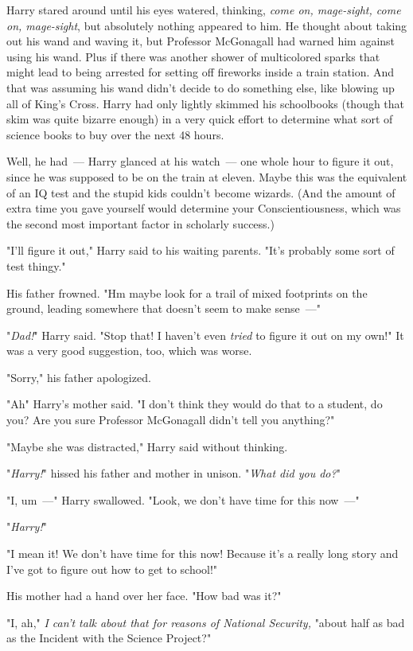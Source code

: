 Harry stared around until his eyes watered, thinking, \emph{come on,
mage-sight, come on, mage-sight}, but absolutely nothing appeared to him. He
thought about taking out his wand and waving it, but Professor McGonagall had
warned him against using his wand. Plus if there was another shower of
multicolored sparks that might lead to being arrested for setting off
fireworks inside a train station. And that was assuming his wand didn't decide
to do something else, like blowing up all of King's Cross. Harry had only
lightly skimmed his schoolbooks (though that skim was quite bizarre enough) in
a very quick effort to determine what sort of science books to buy over the
next 48 hours.

Well, he had~--- Harry glanced at his watch~--- one whole hour to figure it out,
since he was supposed to be on the train at eleven. Maybe this was the
equivalent of an IQ test and the stupid kids couldn't become wizards. (And the
amount of extra time you gave yourself would determine your Conscientiousness,
which was the second most important factor in scholarly success.)

"I'll figure it out," Harry said to his waiting parents. "It's probably some
sort of test thingy."

His father frowned. "Hm{\el} maybe look for a trail of mixed footprints on
the ground, leading somewhere that doesn't seem to make sense~---"

"\emph{Dad!}" Harry said. "Stop that! I haven't even \emph{tried} to figure it
out on my own!" It was a very good suggestion, too, which was worse.

"Sorry," his father apologized.

"Ah{\el}" Harry's mother said. "I don't think they would do that to a
student, do you? Are you sure Professor McGonagall didn't tell you anything?"

"Maybe she was distracted," Harry said without thinking.

"\emph{Harry!}" hissed his father and mother in unison. "\emph{What did you
do?}"

"I, um~---" Harry swallowed. "Look, we don't have time for this now~---"

"\emph{Harry!}"

"I mean it! We don't have time for this now! Because it's a really long story
and I've got to figure out how to get to school!"

His mother had a hand over her face. "How bad was it?"

"I, ah," \emph{I can't talk about that for reasons of National Security,}
"about half as bad as the Incident with the Science Project?"

